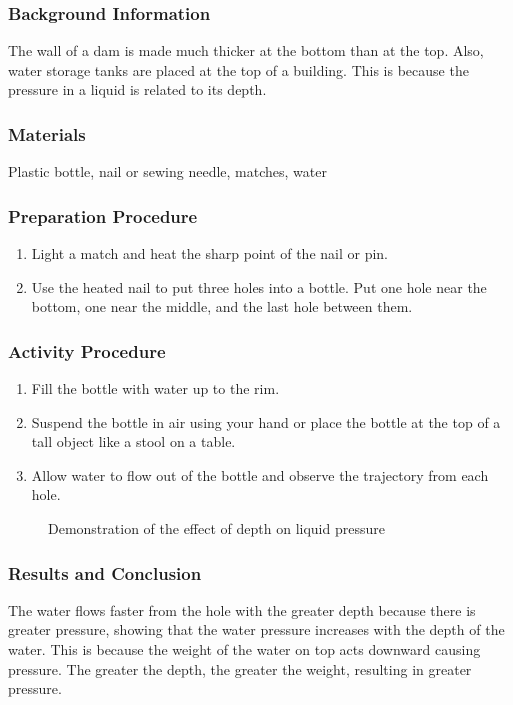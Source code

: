 \subsubsection*{Background Information}
The wall of a dam is made much thicker at the bottom than at the top. Also, water storage tanks are placed at the top of a building. This is because the pressure in a liquid is related to its depth.

\subsubsection*{Materials}
Plastic bottle, nail or sewing needle, matches, water


\subsubsection*{Preparation Procedure}
\begin{enumerate}
\item{Light a match and heat the sharp point of the nail or pin.} 
\item{Use the heated nail to put three holes into a bottle. Put one hole near the bottom, one near the middle, and the last hole between them.} 
\end{enumerate}

\subsubsection*{Activity Procedure}
\begin{enumerate}
\item{Fill the bottle with water up to the rim.} 
\item{Suspend the bottle in air using your hand or place the bottle at the top of a tall object like a stool on a table.} 
\item{Allow water to flow out of the bottle and observe the trajectory from each hole.} 
\end{enumerate}

\begin{figure}
\begin{center}
\def\svgwidth{250pt}

\caption{Demonstration of the effect of depth on liquid pressure}
\label{fig:pressure-liquid}
\end{center}
\end{figure}

\subsubsection*{Results and Conclusion}
The water flows faster from the hole with the greater depth because there is greater pressure, showing that the water pressure increases with the depth of the water. This is because the weight of the water on top acts downward causing pressure. The greater the depth, the greater the weight, resulting in greater pressure. 

